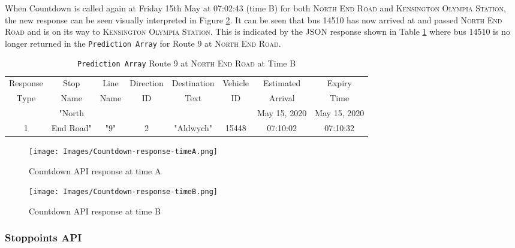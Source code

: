 When Countdown is called again at Friday 15th May at 07:02:43 (time B) for both \textsc{North End Road} and \textsc{Kensington Olympia Station}, the new response can be seen visually interpreted in Figure \ref{fig:countdown-response-timeB}. It can be seen that bus 14510 has now arrived at and passed \textsc{North End Road} and is on its way to \textsc{Kensington Olympia Station}. This is indicated by the JSON response shown in Table \ref{table:prediction-array-stopa-updated} where bus 14510 is no longer returned in the \texttt{Prediction Array} for Route 9 at \textsc{North End Road}.

\begin{table}[H]
    \centering
    \setlength\tabcolsep{2pt}
    \begin{tabular}{|c|c|c|c|c|c|c|c|}
        \hline
          Response & Stop   &   Line & Direction & Destination & Vehicle & Estimated & Expiry \\[-3pt]
           Type & Name &    Name & ID &  Text & ID & Arrival &  Time \\
        \hline
             & "North &  &  &  &  & May 15, 2020 & May 15, 2020 \\[-3pt]
            1 & End Road" & "9" & 2 & "Aldwych" & 15448 & 07:10:02 & 07:10:32 \\
        \hline
        \end{tabular}
    \caption{\texttt{Prediction Array} Route 9 at \textsc{North End Road} at Time B}
    \label{table:prediction-array-stopa-updated}
\end{table}

\begin{figure}[H]
\begin{center}
    \texttt{[image: Images/Countdown-response-timeA.png]}
    \caption{Countdown API response at time A}
    \label{fig:countdown-response-timeA}
\end{center}
\end{figure}

\begin{figure}[H]
\begin{center}
    \texttt{[image: Images/Countdown-response-timeB.png]}
    \caption{Countdown API response at time B}
    \label{fig:countdown-response-timeB}
\end{center}
\end{figure}

\subsubsection{Stoppoints API}

